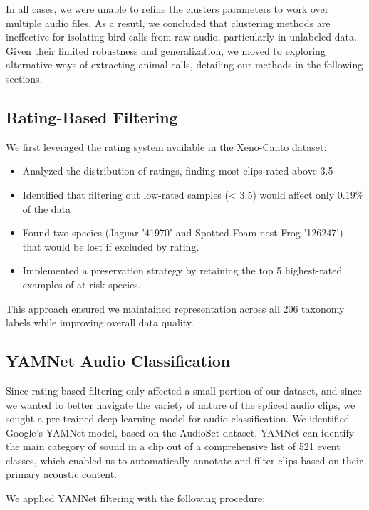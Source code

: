 \documentclass[10pt]{article}
\begin{document}
In all cases, we were unable to refine the clusters parameters to work over multiple audio files. As a resutl, we concluded that clustering methods are ineffective for isolating bird calls from raw audio, particularly in unlabeled data. Given their limited robustness and generalization, we moved to exploring alternative ways of extracting animal calls, detailing our methods in the following sections.

\subsection*{Rating-Based Filtering}

We first leveraged the rating system available in the Xeno-Canto dataset:

\begin{itemize}
  \item Analyzed the distribution of ratings, finding most clips rated above 3.5
  \item Identified that filtering out low-rated samples (< 3.5) would affect only 0.19\% of the data
  \item Found two species (Jaguar '41970' and Spotted Foam-nest Frog '126247') that would be lost if excluded by rating.
  \item Implemented a preservation strategy by retaining the top 5 highest-rated examples of at-risk species.
\end{itemize}

This approach ensured we maintained representation across all 206 taxonomy labels while improving overall data quality.

\subsection*{YAMNet Audio Classification}

Since rating-based filtering only affected a small portion of our dataset, and since we wanted to better navigate the variety of nature of the spliced audio clips, we sought a pre-trained deep learning model for audio classification. We identified Google's YAMNet model,  based on the AudioSet dataset. YAMNet can identify the main category of sound in a clip out of a comprehensive list of 521 event classes, which enabled us to automatically annotate and filter clips based on their primary acoustic content.

We applied YAMNet filtering with the following procedure:
\end{document}
